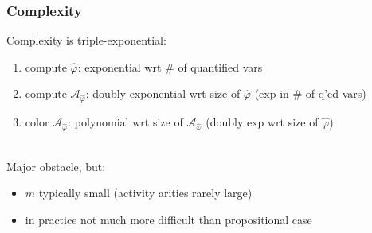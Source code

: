 \documentclass[xcolor=dvipsnames,aspectratio=169]{beamer}
\newcommand{\A}{\mathcal A\xspace}
\begin{document}
\begin{frame}
\frametitle{Complexity}

Complexity is triple-exponential:
\begin{enumerate}
	\item compute $\hat\varphi$: exponential wrt \# of quantified vars
	\item compute $\A_{\hat\varphi}$: doubly exponential wrt size of $\hat\varphi$ (exp in \# of q'ed vars)
	\item color $\A_{\hat\varphi}$: polynomial wrt size of $\A_{\hat\varphi}$ (doubly exp wrt size of $\hat\varphi$)
\end{enumerate}

~\\

Major obstacle, but:
\begin{itemize}
	\item $m$ typically small (activity arities rarely large)
	\item in practice not much more difficult than propositional case
\end{itemize}

\end{frame}

\end{document}
